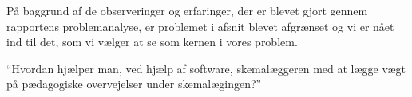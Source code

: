 På baggrund af de observeringer og erfaringer, der er blevet gjort gennem rapportens problemanalyse, er problemet i afsnit blevet afgrænset og vi er nået ind til det, som vi vælger at se som kernen i vores problem.

``Hvordan hjælper man, ved hjælp af software, skemalæggeren med at lægge vægt på pædagogiske overvejelser under skemalægingen?''
